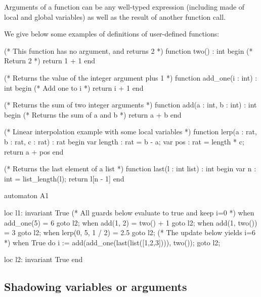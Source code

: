 Arguments of a function can be any well-typed expression (including made of local and global variables) as well as the result of another function call.

\begin{example}
We give below some examples of definitions of user-defined functions:

\begin{IMITATORmodel}
(* This function has no argument, and returns 2 *)
function two() : int
begin
	(* Return 2 *)
	return 1 + 1
end

(* Returns the value of the integer argument plus 1 *)
function add_one(i : int) : int
begin
	(* Add one to i *)
	return i + 1
end

(* Returns the sum of two integer arguments *)
function add(a : int, b : int) : int
begin
	(* Returns the sum of a and b *)
	return a + b
end

(* Linear interpolation example with some local variables *)
function lerp(a : rat, b : rat, c : rat) : rat
begin
	var length : rat = b - a;
	var pos : rat = length * c;
	return a + pos
end

(* Returns the last element of a list *)
function last(l : int list) : int
begin
	var n : int = list_length(l);
	return l[n - 1]
end

automaton A1

loc l1: invariant True
	(* All guards below evaluate to true and keep i=0 *)
	when add_one(5) = 6                                            goto l2;
	when add(1, 2) = two() + 1                                     goto l2;
	when add(1, two()) = 3                                         goto l2;
	when lerp(0, 5, 1 / 2) = 2.5                                   goto l2;
	(* The update below yields i=6 *)
	when True do {i := add(add_one(last(list([1,2,3]))), two()); } goto l2;

loc l2: invariant True
end
\end{IMITATORmodel}
\end{example}


\subsection{Shadowing variables or arguments}

